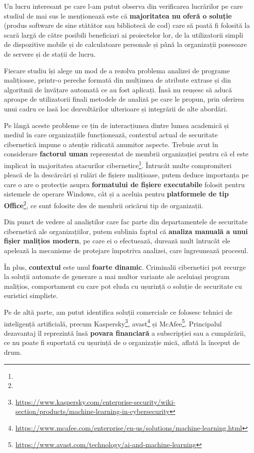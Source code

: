 \documentclass[../../main.tex]{subfiles}
\begin{document}
Un lucru interesant pe care l-am putut observa din verificarea lucrărilor pe care studiul de mai sus le menționează este că \textbf{majoritatea nu oferă o soluție} (produs software de sine stătător sau bibliotecă de cod) care să poată fi folosită la scară largă de către posibili beneficiari ai proiectelor lor, de la utilizatorii simpli de dispozitive mobile și de calculatoare personale și până la organizații posesoare de servere și de stații de lucru.

Fiecare studiu își alege un mod de a rezolva problema analizei de programe malițioase, printr-o pereche formată din mulțimea de atribute extrase și din algoritmii de învățare automată ce au fost aplicați. Însă nu reușesc să aducă aproape de utilizatorii finali metodele de analiză pe care le propun, prin oferirea unui cadru ce lasă loc dezvoltărilor ulterioare și integrării de alte abordări.

Pe lângă aceste probleme ce țin de interacțiunea dintre lumea academică și mediul în care organizațiile funcționează, contextul actual de securitate cibernetică impune o atenție ridicată anumitor aspecte. Trebuie avut în considerare \textbf{factorul uman} reprezentat de membrii organizației pentru că el este implicat în majoritatea atacurilor cibernetice\footnote{}. Întrucât multe compromiteri pleacă de la descărcări și rulări de fișiere malițioase, putem deduce importanța pe care o are o protecție asupra \textbf{formatului de fișiere executabile} folosit pentru sistemele de operare Windows, cât și a aceluia pentru \textbf{platformele de tip Office}\footnote{}, ce sunt folosite des de membrii oricărui tip de organizații.

Din punct de vedere al analiștilor care fac parte din departamentele de securitate cibernetică ale organizațiilor, putem sublinia faptul că \textbf{analiza manuală a unui fișier malițios modern}, pe care ei o efectuează, durează mult întrucât ele apelează la mecanisme de protejare împotriva analizei, care îngreunează procesul.

În plus, \textbf{contextul} este unul \textbf{foarte dinamic}. Criminalii cibernetici pot recurge la soluții automate de generare a mai multor variante ale aceluiași program malițios, comportament cu care pot eluda cu ușurință o soluție de securitate cu euristici simpliste.

Pe de altă parte, am putut identifica soluții comerciale ce folosesc tehnici de inteligență artificială, precum Kaspersky\footnote{\href{https://www.kaspersky.com/enterprise-security/wiki-section/products/machine-learning-in-cybersecurity}{https://www.kaspersky.com/enterprise-security/wiki-section/products/machine-learning-in-cybersecurity}}, avast\footnote{\href{https://www.mcafee.com/enterprise/en-us/solutions/machine-learning.html}{https://www.mcafee.com/enterprise/en-us/solutions/machine-learning.html}} și McAfee\footnote{\href{https://www.avast.com/technology/ai-and-machine-learning}{https://www.avast.com/technology/ai-and-machine-learning}}. Principalul dezavantaj îl reprezintă însă \textbf{povara financiară} a subscripției sau a cumpărării, ce nu poate fi suportată cu ușurință de o organizație mică, aflată la început de drum.
\end{document}
